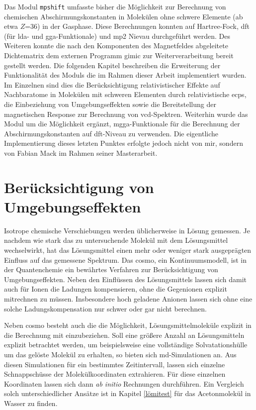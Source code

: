 Das Modul \texttt{mpshift} umfasste bisher die Möglichkeit zur Berechnung von chemischen Abschirmungskonstanten in Molekülen ohne schwere Elemente (ab etwa $Z$=36) in der Gasphase. Diese Berechnungen konnten auf Hartree-Fock, \ac{dft} (für \ac{lda}- und \ac{gga}-Funktionale) und \ac{mp2} Nievau durchgeführt werden. Des Weiteren konnte die nach den Komponenten des Magnetfeldes abgeleitete Dichtematrix dem externen Programm \ac{gimic} zur Weiterverarbeitung bereit gestellt werden. Die folgenden Kapitel beschreiben die Erweiterung der Funktionalität des Moduls die im Rahmen dieser Arbeit implementiert wurden. Im Einzelnen sind dies die Berücksichtigung relativistischer Effekte auf Nachbaratome in Molekülen mit schweren Elementen durch relativistische \acp{ecp}, die Einbeziehung von Umgebungseffekten sowie die Bereitstellung der magnetischen Response zur Berechnung von \ac{vcd}-Spektren. Weiterhin wurde das Modul um die Möglichkeit ergänzt, \ac{mgga}-Funktionale für die Berechnung der Abschirmungskonstanten auf \ac{dft}-Niveau zu verwenden. Die eigentliche Implementierung dieses letzten Punktes erfolgte jedoch nicht von mir, sondern von Fabian Mack im Rahmen seiner Masterarbeit.\supercite{mack2017} 


\section{Berücksichtigung von Umgebungseffekten}
Isotrope chemische Verschiebungen werden üblicherweise in Lösung gemessen. Je nachdem wie stark das zu untersuchende Molekül mit dem Lösungsmittel wechselwirkt, hat das Lösungsmittel einen mehr oder weniger stark ausgeprägten Einfluss auf das gemessene Spektrum. Das \ac{cosmo}\supercite{klamt1993cosmo}, ein Kontinuumsmodell, ist in der Quantenchemie ein bewährtes Verfahren zur Berücksichtigung von Umgebungseffekten. Neben den Einflüssen des Lösungsmittels lassen sich damit auch für Ionen die Ladungen kompensieren, ohne die Gegenionen explizit mitrechnen zu müssen. Insbesondere hoch geladene Anionen lassen sich ohne eine solche Ladungskompensation nur schwer oder gar nicht berechnen. 

Neben \ac{cosmo} besteht auch die die Möglichkeit, Lösungsmittelmoleküle explizit in die Berechnung mit einzubeziehen. Soll eine größere Anzahl an Lösungsmitteln explizit betrachtet werden, um beispielsweise eine vollständige Solvatationshülle um das gelöste Molekül zu erhalten, so bieten sich \ac{md}-Simulationen an. Aus diesen Simulationen für ein bestimmtes Zeitintervall, lassen sich einzelne Schnappschüsse der Molekülkoordinaten extrahieren. Für diese einzelnen Koordinaten lassen sich dann \textit{ab initio} Rechnungen durchführen. Ein Vergleich solch unterschiedlicher Ansätze ist in Kapitel \ref{lömitest} für das Acetonmolekül in Wasser zu finden. 
